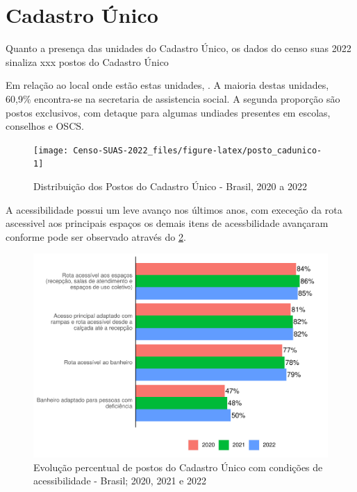 \documentclass[
  brazilian]{report}
\begin{document}
\hypertarget{cadastro-uxfanico}{%
\section{Cadastro Único}\label{cadastro-uxfanico}}

Quanto a presença das unidades do Cadastro Único, os dados do censo suas
2022 sinaliza xxx postos do Cadastro Único

Em relação ao local onde estão estas unidades,
. A maioria destas unidades, 60,9\% encontra-se
na secretaria de assistencia social. A segunda proporção são postos
exclusivos, com detaque para algumas undiades presentes em escolas,
conselhos e OSCS.

\begin{figure}
\texttt{[image: Censo-SUAS-2022\_files/figure-latex/posto\_cadunico-1]} \caption[Distribuição dos Postos do Cadastro Único - Brasil, 2020 a 2022]{Distribuição dos Postos do Cadastro Único - Brasil, 2020 a 2022}\label{fig:posto_cadunico}
\end{figure}

A acessibilidade possui um leve avanço nos últimos anos, com execeção da
rota ascessivel aos principais espaços os demais itens de acessbilidade
avançaram conforme pode ser observado através do
\cref{fig:postcad-acessibilidade}.

\begin{figure}
\includegraphics{Censo-SUAS-2022_files/figure-latex/postcad-acessibilidade-1} \caption[Evolução percentual de postos do Cadastro Único com condições de acessibilidade - Brasil]{Evolução percentual de postos do Cadastro Único com condições de acessibilidade - Brasil; 2020, 2021 e 2022}\label{fig:postcad-acessibilidade}
\end{figure}
\end{document}
